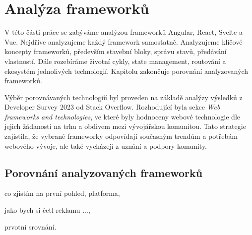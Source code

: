 \section{Analýza frameworků}

V této části práce se zabýváme analýzou frameworků Angular, React, Svelte a Vue. Nejdříve analyzujeme každý framework samostatně. 
Analyzujeme klíčové koncepty frameworků, především stavební bloky, správu stavů, předávání vlastností. 
Dále rozebíráme životní cykly, state management, routování a ekosystém jednolivých technologií. 
Kapitolu zakončuje porovnání analyzovaných frameworků.

Výběr porovnávaných technologiíí byl proveden na základě analýzy výsledků z Developer Survey 2023 od Stack Overflow. 
Rozhodující byla sekce \emph{Web frameworks and technologies}, ve které byly hodnoceny webové technologie dle jejich žádanosti na trhu a obdivem mezi vývojářskou komunitou. 
Tato strategie zajistila, že vybrané frameworky odpovídají současným trendům a potřebám webového vývoje, ale také vycházejí z uznání a podpory komunity.\cite{stackoverflow, developersurvey}







\subsection{Porovnání analyzovaných frameworků}


\begin{citemize}
	\item co zjistím na první pohled, platforma,
	\item jako bych si četl reklamu ...,
	\item prvotní srovnání.
\end{citemize}
